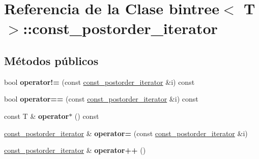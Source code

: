 \hypertarget{classbintree_1_1const__postorder__iterator}{}\section{Referencia de la Clase bintree$<$ T $>$\+:\+:const\+\_\+postorder\+\_\+iterator}
\label{classbintree_1_1const__postorder__iterator}
\subsection*{Métodos públicos}
\begin{DoxyCompactItemize}
\item 
bool {\bfseries operator!=} (const \hyperlink{classbintree_1_1const__postorder__iterator}{const\+\_\+postorder\+\_\+iterator} \&i) const \hypertarget{classbintree_1_1const__postorder__iterator_a3d67bad572cc78bb6a4e4e557fea9011}{}\label{classbintree_1_1const__postorder__iterator_a3d67bad572cc78bb6a4e4e557fea9011}

\item 
bool {\bfseries operator==} (const \hyperlink{classbintree_1_1const__postorder__iterator}{const\+\_\+postorder\+\_\+iterator} \&i) const \hypertarget{classbintree_1_1const__postorder__iterator_a2f2c501004e04fa3b6e6750d13eac0d2}{}\label{classbintree_1_1const__postorder__iterator_a2f2c501004e04fa3b6e6750d13eac0d2}

\item 
const T \& {\bfseries operator$\ast$} () const \hypertarget{classbintree_1_1const__postorder__iterator_ab4931904dd88d217ab4267654223c4b8}{}\label{classbintree_1_1const__postorder__iterator_ab4931904dd88d217ab4267654223c4b8}

\item 
\hyperlink{classbintree_1_1const__postorder__iterator}{const\+\_\+postorder\+\_\+iterator} \& {\bfseries operator=} (const \hyperlink{classbintree_1_1const__postorder__iterator}{const\+\_\+postorder\+\_\+iterator} \&i)\hypertarget{classbintree_1_1const__postorder__iterator_a067e16ec2ac44c724491315e67d70ca9}{}\label{classbintree_1_1const__postorder__iterator_a067e16ec2ac44c724491315e67d70ca9}

\item 
\hyperlink{classbintree_1_1const__postorder__iterator}{const\+\_\+postorder\+\_\+iterator} \& {\bfseries operator++} ()\hypertarget{classbintree_1_1const__postorder__iterator_a314cb317a668b135c4bdb9612e47ff0f}{}\label{classbintree_1_1const__postorder__iterator_a314cb317a668b135c4bdb9612e47ff0f}

\end{DoxyCompactItemize}

